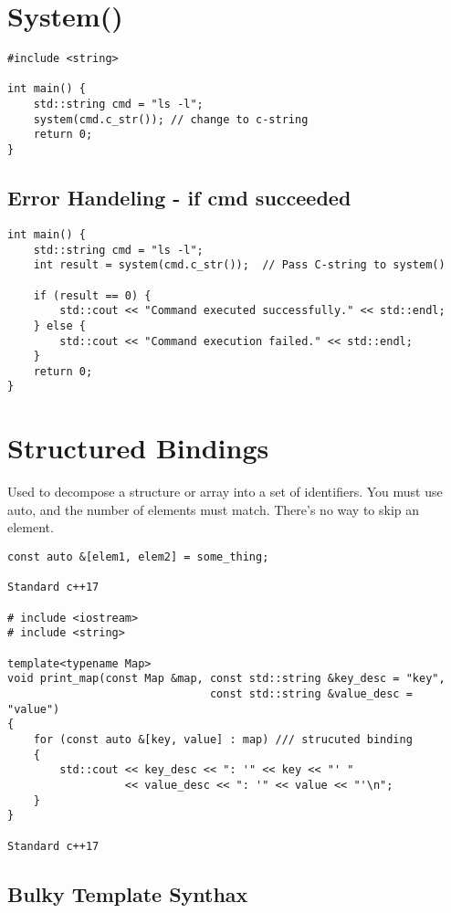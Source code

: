 \section{System()}

\begin{verbatim}
#include <string>

int main() {
    std::string cmd = "ls -l";
    system(cmd.c_str()); // change to c-string
    return 0;
}
\end{verbatim}

\subsection{Error Handeling - if cmd succeeded}

\begin{verbatim}
int main() {
    std::string cmd = "ls -l";
    int result = system(cmd.c_str());  // Pass C-string to system()

    if (result == 0) {
        std::cout << "Command executed successfully." << std::endl;
    } else {
        std::cout << "Command execution failed." << std::endl;
    }
    return 0;
}
\end{verbatim}

\section{Structured Bindings}

Used to decompose a structure or array into a set of identifiers.
You must use auto, and the number of elements must match. There's no way to skip an element.

\begin{verbatim}
const auto &[elem1, elem2] = some_thing;

Standard c++17

# include <iostream>
# include <string>

template<typename Map>
void print_map(const Map &map, const std::string &key_desc = "key",
                               const std::string &value_desc = "value")
{
    for (const auto &[key, value] : map) /// strucuted binding
    {
        std::cout << key_desc << ": '" << key << "' "
                  << value_desc << ": '" << value << "'\n";
    }
}

Standard c++17
\end{verbatim}

\subsection{Bulky Template Synthax}

